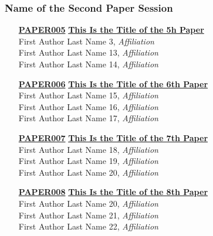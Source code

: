 \subsubsection{Name of the Second Paper Session}
\begin{enumerate}
\item[\href{https://doi.org/10.1145/1111111.1111116}{\textbf{PAPER005}}]
\href{https://doi.org/10.1145/1111111.1111116}{\textbf{This Is the Title of the 5h Paper}}\\
First Author Last Name 3, \emph{Affiliation}\\
First Author Last Name 13, \emph{Affiliation}\\
First Author Last Name 14, \emph{Affiliation}\\

\item[\href{https://doi.org/10.1145/1111111.1111117}{\textbf{PAPER006}}]
\href{https://doi.org/10.1145/1111111.1111117}{\textbf{This Is the Title of the 6th Paper}}\\
First Author Last Name 15, \emph{Affiliation}\\
First Author Last Name 16, \emph{Affiliation}\\
First Author Last Name 17, \emph{Affiliation}\\

\item[\href{https://doi.org/10.1145/1111111.1111118}{\textbf{PAPER007}}]
\href{https://doi.org/10.1145/1111111.1111118}{\textbf{This Is the Title of the 7th Paper}}\\
First Author Last Name 18, \emph{Affiliation}\\
First Author Last Name 19, \emph{Affiliation}\\
First Author Last Name 20, \emph{Affiliation}\\

\item[\href{https://doi.org/10.1145/1111111.1111119}{\textbf{PAPER008}}]
\href{https://doi.org/10.1145/1111111.1111119}{\textbf{This Is the Title of the 8th Paper}}\\
First Author Last Name 20, \emph{Affiliation}\\
First Author Last Name 21, \emph{Affiliation}\\
First Author Last Name 22, \emph{Affiliation}\\
\end{enumerate}


